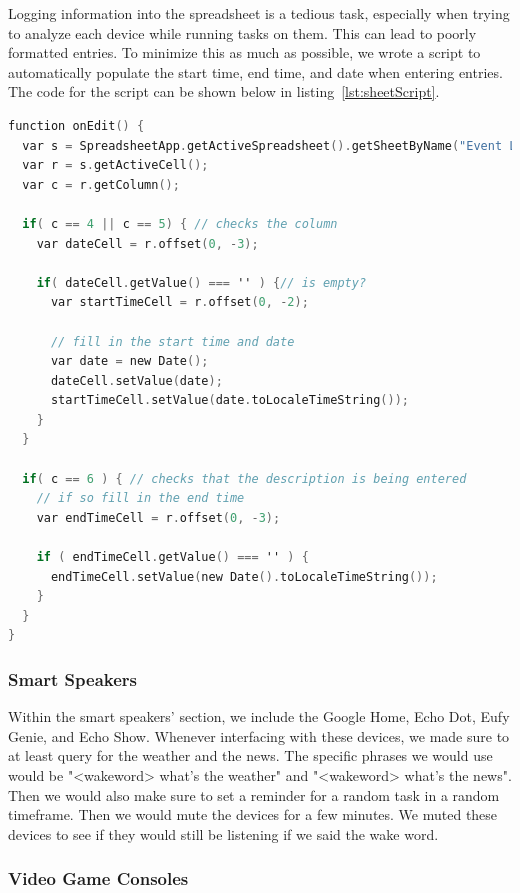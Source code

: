 Logging information into the spreadsheet is a tedious task, especially when trying to analyze each device while running tasks on them. This can lead to poorly formatted entries. To minimize this as much as possible, we wrote a script to automatically populate the start time, end time, and date when entering entries. The code for the script can be shown below in listing~\ref{lst:sheetScript}.

\begin{lstlisting}[language=C,label={lst:sheetScript},caption={Open and Read from a Socket},captionpos=b]
function onEdit() {
  var s = SpreadsheetApp.getActiveSpreadsheet().getSheetByName("Event Log");
  var r = s.getActiveCell();
  var c = r.getColumn();

  if( c == 4 || c == 5) { // checks the column
    var dateCell = r.offset(0, -3);

    if( dateCell.getValue() === '' ) {// is empty?
      var startTimeCell = r.offset(0, -2);

      // fill in the start time and date
      var date = new Date();
      dateCell.setValue(date);
      startTimeCell.setValue(date.toLocaleTimeString());
    }
  }

  if( c == 6 ) { // checks that the description is being entered
    // if so fill in the end time
    var endTimeCell = r.offset(0, -3);

    if ( endTimeCell.getValue() === '' ) {
      endTimeCell.setValue(new Date().toLocaleTimeString());
    }
  }
}
\end{lstlisting}

\subsubsection{Smart Speakers}

Within the smart speakers' section, we include the Google Home, Echo Dot, Eufy Genie, and Echo Show. Whenever interfacing with these devices, we made sure to at least query for the weather and the news. The specific phrases we would use would be "<wakeword> what's the weather" and "<wakeword> what's the news". Then we would also make sure to set a reminder for a random task in a random timeframe. Then we would mute the devices for a few minutes. We muted these devices to see if they would still be listening if we said the wake word.

\subsubsection{Video Game Consoles}

